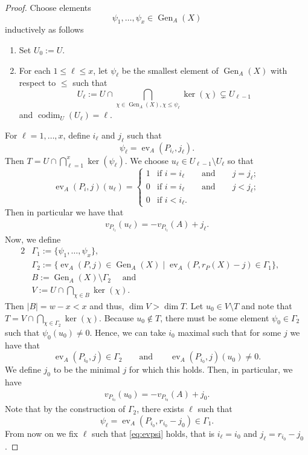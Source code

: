 \documentclass[10pt,a4paper]{amsart}
\DeclareMathOperator{\Gen}{Gen}
\DeclareMathOperator{\ev}{ev}
\renewcommand{\leq}{\leqslant}
\begin{document}
\begin{proof}
		Choose elements 
		$$\psi_1, \ldots , \psi_x \in \Gen_A(X)  $$
		inductively as follows
		\begin{enumerate}[1.]
			\item Set $U_0:=U$.
			\item For each $1\le \ell \le x$, let $\psi_\ell$ be the smallest element of $\Gen_A(X)$ with respect to $\leq$ such that
			$$
			U_\ell:=U \cap\bigcap_{\chi\in\Gen_A(X), \chi\le \psi_\ell }\ker(\chi)
			\subsetneq U_{\ell-1}
			$$
			and $\operatorname{codim}_U(U_\ell )=\ell$.
		\end{enumerate}
		For $\ell = 1, \ldots, x$, define $i_\ell$ and $j_\ell$ such that
		$$\psi_{\ell}=\ev_{A}(P_{i_\ell},j_\ell).$$
		Then $T = U \cap \bigcap_{\ell = 1}^x \ker(\psi_\ell)$.
		We choose $u_\ell \in U_{\ell-1} \setminus U_\ell $ so that 
		\begin{equation} \label{eq:ul}
			\ev_A(P_i,j)(u_\ell) =\begin{cases}
				1&\text{if } i=i_\ell \qquad \text{and} \qquad j=j_\ell;\\
				0&\text{if } i= i_\ell \qquad\text{and}\qquad  j< j_\ell;\\
				0&\text{if } i< i_\ell.
			\end{cases}
		\end{equation} 
		Then in particular we have that
		\begin{align}
			v_{P_{i_\ell} } (u_\ell) =-v_{P_{i_\ell}} (A) +j_\ell .
			\label{eq:s_u}
		\end{align}
		Now, we define 
		\begin{alignat*}{2}
			& \Gamma_1 := \{\psi_1, \ldots, \psi_x\}, &&\\
			&\Gamma_2:=\{\ev_A( P, j) \in \Gen_A(X) \mid \ev_A (P,r_P(X) - j)\in \Gamma_1\}, &&\\
			& B:= \Gen_A(X) \setminus \Gamma_2 \quad \text{ and }&&\\
			& V := U \cap \bigcap_{\chi\in B}\ker(\chi). &&
		\end{alignat*}
		Then $|B|=w-x<x $ and thus, $\dim V >\dim T.$ Let $u_0 \in V\setminus T$ and note that $T = V \cap \bigcap_{\chi \in \Gamma_2} \ker(\chi)$. Because $u_0\notin T$, there must be some element $\psi_0 \in \Gamma_2$ such that $\psi_0(u_0) \neq 0$. Hence, we can take $i_0$ maximal such that for some $j$ we have that
		$$\ev_A(P_{i_0},j )\in \Gamma_2 \qquad\text{and}\qquad \ev_A(P_{i_0},j)(u_0)\neq 0.$$
		We define $j_0$ to be the minimal $j$ for which this holds. Then, in particular, we have 
		\begin{align}
			v_{P_{ i_0} } (u_0)  = -v_{P_{i_0}}(A) +j_0    \label{eq:d}.
		\end{align}
		Note that by the construction of $\Gamma_2$, there exists $\ell$ such that 
		\begin{equation}\label{eq:evpsi} \psi_\ell=\ev_{A}(P_{i_0},r_{i_0}-j_0) \in \Gamma_1.
		\end{equation}
		From now on we fix $\ell$ such that \eqref{eq:evpsi} holds, that is $i_\ell = i_0$ and $j_\ell = r_{i_0} - j_0$. 
		

\end{proof}
\end{document}
